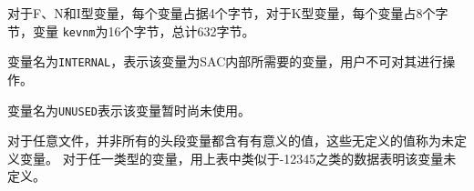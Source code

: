 对于F、N和I型变量，每个变量占据4个字节，对于K型变量，每个变量占8个字节，变量
\lstinline{kevnm}为16个字节，总计632字节。

变量名为\lstinline{INTERNAL}，表示该变量为SAC内部所需要的变量，用户不可对其进行操作。

变量名为\lstinline{UNUSED}表示该变量暂时尚未使用。

对于任意文件，并非所有的头段变量都含有有意义的值，这些无定义的值称为未定义变量。
对于任一类型的变量，用上表中类似于-12345之类的数据表明该变量未定义。
